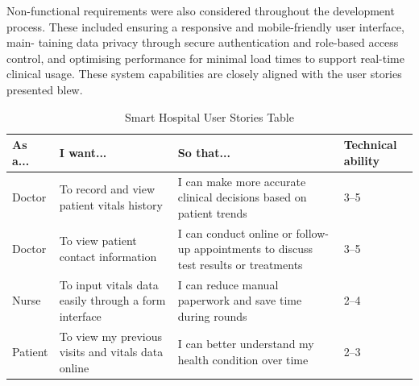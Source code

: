 Non-functional requirements were also considered throughout the development process. These included ensuring a responsive and mobile-friendly user interface, main-
taining data privacy through secure authentication and role-based access control, and optimising
performance for minimal load times to support real-time clinical usage. These system capabilities are closely aligned with the user stories
presented blew.

\vspace{1em}
\begin{table}[H]
\centering
\renewcommand{\arraystretch}{1.4}
\begin{tabular}{|p{2cm}|p{5.2cm}|p{5.2cm}|p{2cm}|}
\hline
\textbf{As a...} & \textbf{I want...} & \textbf{So that...} & \textbf{Technical ability} \\
\hline
Doctor & To record and view patient vitals history & I can make more accurate clinical decisions based on patient trends & 3--5 \\
\hline
Doctor & To view patient contact information & I can conduct online or follow-up appointments to discuss test results or treatments & 3--5 \\
\hline
Nurse & To input vitals data easily through a form interface & I can reduce manual paperwork and save time during rounds & 2--4 \\
\hline
Patient & To view my previous visits and vitals data online & I can better understand my health condition over time & 2--3 \\
\hline
\end{tabular}
\caption{Smart Hospital User Stories Table} %
\label{tab:user-stories}%
\end{table}

\vspace{1em}

